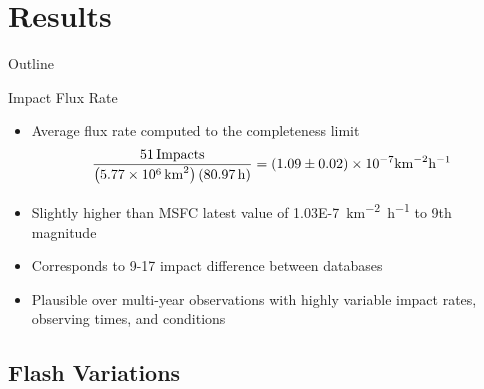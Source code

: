 \documentclass[pdf]{beamer}
\begin{document}
 \section{Results}

 \begin{frame}{Outline}
   \tableofcontents[currentsection]
 \end{frame}

 \begin{frame}{Impact Flux Rate}
   \begin{itemize}
	 \item Average flux rate computed to the completeness limit
	   \[\frac{\SI{51}{Impacts}}{\left( \SI{5.77E6}{\kilo\meter^2} \right)\left( \SI{80.97}{\hour} \right)} = \left( 1.09\pm0.02 \right)\times 10^{-7} \si{\kilo\meter^{-2}\hour^{-1}}\]
	 \item Slightly higher than MSFC latest value of \SI{1.03E-7}{\kilo\meter^{-2}\hour^{-1}} to 9th magnitude \citep{Suggs2014}
	 \item Corresponds to 9-17 impact difference between databases
	 \item Plausible over multi-year observations with highly variable impact rates, observing times, and conditions
   \end{itemize}
 \end{frame}

 \subsection{Flash Variations}
\end{document}
